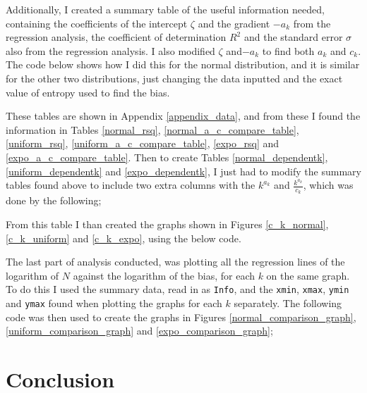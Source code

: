 \documentclass[12pt]{report}
\begin{document}
\begin{appendix}


Additionally, I created a summary table of the useful information needed, containing the coefficients of the intercept $\zeta$ and the gradient $-a_{k}$ from the regression analysis, the coefficient of determination $R^2$ and the standard error $\sigma$ also from the regression analysis. I also modified $\zeta$ and$-a_{k}$ to find both $a_{k}$ and $c_{k}$. The code below shows how I did this for the normal distribution, and it is similar for the other two distributions, just changing the data inputted and the exact value of entropy used to find the bias.



These tables are shown in Appendix \ref{appendix_data}, and from these I found the information in Tables \ref{normal_rsq}, \ref{normal_a_c_compare_table}, \ref{uniform_rsq}, \ref{uniform_a_c_compare_table}, \ref{expo_rsq} and \ref{expo_a_c_compare_table}. Then to create Tables \ref{normal_dependentk}, \ref{uniform_dependentk} and \ref{expo_dependentk}, I just had to modify the summary tables found above to include two extra columns with the $k^{a_{k}}$ and $\frac{k^{a_{k}}}{c_{k}}$, which was done by the following;



From this table I than created the graphs shown in Figures \ref{c_k_normal}, \ref{c_k_uniform} and \ref{c_k_expo}, using the below code.



The last part of analysis conducted, was plotting all the regression lines of the logarithm of $N$ against the logarithm of the bias, for each $k$ on the same graph. To do this I used the summary data, read in as \texttt{Info}, and the \texttt{xmin}, \texttt{xmax}, \texttt{ymin} and \texttt{ymax} found when plotting the graphs for each $k$ separately. The following code was then used to create the graphs in Figures \ref{normal_comparison_graph}, \ref{uniform_comparison_graph} and \ref{expo_comparison_graph};





\section{Conclusion}


\end{appendix}
\end{document}
